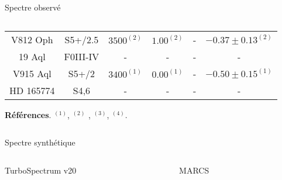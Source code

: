 \documentclass[10pt]{beamer}
\begin{document}
\begin{frame}[fragile]{Spectre observé}
\begin{columns}
\begin{column}{0.7\textwidth}
\begin{table}[h!]
\begin{center}
\begin{tabular}{cccccc}
                    V812 Oph  & S5+/2.5 & $3500^{(2)}$ & $1.00^{(2)}$ & - & $-0.37\pm0.13^{(2)}$\\
                    19 Aql  & F0III-IV & - & - & - & -  \\
                    V915 Aql  & S5+/2 & $3400^{(1)}$ & $0.00^{(1)}$ & - & $-0.50\pm0.15^{(1)}$ \\
                    HD 165774 & S4,6 & - & - & - & - \\
                    \hline
                \end{tabular}
                \end{center}
            
            \textbf{Références}. $^{(1)}$\cite{shetye_s_2018}, $^{(2)}$\cite{shetye_s_2021} , $^{(3)}$\cite{karinkuzhi_when_2018}, $^{(4)}$\cite{shetye_observational_2019}.
                \label{param_stellaire}
            \end{table}
    \end{column}
\end{columns}
\end{frame}

\begin{frame}[fragile]{Spectre synthétique}
    \begin{columns}
        \begin{column}{0.5\textwidth}
            \begin{center}
                TurboSpectrum v20 
            \end{center}
        \end{column}
        \begin{column}{0.5\textwidth}
            \begin{center}
                MARCS 
            \end{center}
        \end{column}
\end{columns}
\end{frame}
\end{document}
